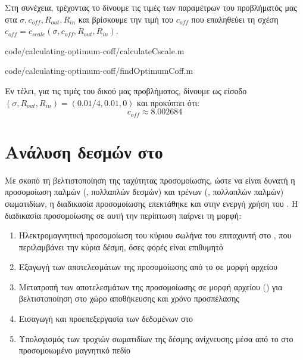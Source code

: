 Στη συνέχεια, τρέχοντας το   δίνουμε τις τιμές των παραμέτρων του προβλήματός μας στα $\sigma, c_{off}, R_{out}, R_{in}$ και βρίσκουμε την τιμή του $c_{off}$ που επαληθεύει τη σχέση $c_{off} = c_{scale} \left(\sigma, c_{off}, R_{out}, R_{in} \right)$.


{code/calculating-optimum-coff/calculateCscale.m}


{code/calculating-optimum-coff/findOptimumCoff.m}

Εν τέλει, για τις τιμές του δικού μας προβλήματος, δίνουμε ως είσοδο $\left(\sigma, R_{out}, R_{in} \right) = \left(0.01/4,0.01, 0 \right)$ και προκύπτει ότι:
\begin{equation}
c_{off} \approx 8.002684
\end{equation}

\section{Ανάλυση δεσμών στο }

Με σκοπό τη βελτιστοποίηση της ταχύτητας προσομοίωσης, ώστε να είναι δυνατή η προσομοίωση παλμών (, πολλαπλών δεσμών) και τρένων (, πολλαπλών παλμών) σωματιδίων, η διαδικασία προσομοίωσης επεκτάθηκε και στην ενεργή χρήση του .
Η διαδικασία προσομοίωσης σε αυτή την περίπτωση παίρνει τη μορφή:
\begin{enumerate}
\item Ηλεκτρομαγνητική προσομοίωση του κύριου σωλήνα του επιταχυντή στο , που περιλαμβάνει την κύρια δέσμη, όσες φορές είναι επιθυμητό
\item Εξαγωγή των αποτελεσμάτων της προσομοίωσης από το  σε μορφή αρχείου 
\item Μετατροπή των αποτελεσμάτων της προσομοίωσης σε μορφή αρχείου  () για βελτιστοποίηση στο χώρο αποθήκευσης και χρόνο προσπέλασης
\item Εισαγωγή και προεπεξεργασία των δεδομένων στο 
\item Υπολογισμός των τροχιών σωματιδίων της δέσμης ανίχνευσης μέσα από το  στο προσομοιωμένο μαγνητικό πεδίο
\end{enumerate}

